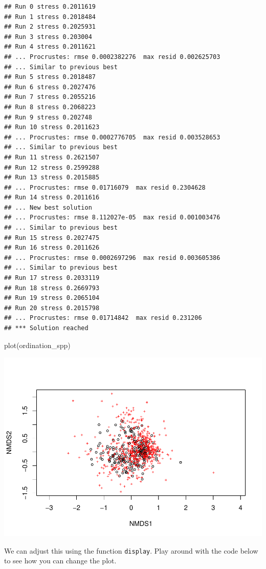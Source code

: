 \documentclass[
]{book}
\newenvironment{Shaded}{\begin{snugshade}}{\end{snugshade}}
\newcommand{\FunctionTok}[1]{\textcolor[rgb]{0.00,0.00,0.00}{#1}}
\newcommand{\NormalTok}[1]{#1}
\begin{document}
\begin{verbatim}
## Run 0 stress 0.2011619 
## Run 1 stress 0.2018484 
## Run 2 stress 0.2025931 
## Run 3 stress 0.203004 
## Run 4 stress 0.2011621 
## ... Procrustes: rmse 0.0002382276  max resid 0.002625703 
## ... Similar to previous best
## Run 5 stress 0.2018487 
## Run 6 stress 0.2027476 
## Run 7 stress 0.2055216 
## Run 8 stress 0.2068223 
## Run 9 stress 0.202748 
## Run 10 stress 0.2011623 
## ... Procrustes: rmse 0.0002776705  max resid 0.003528653 
## ... Similar to previous best
## Run 11 stress 0.2621507 
## Run 12 stress 0.2599288 
## Run 13 stress 0.2015885 
## ... Procrustes: rmse 0.01716079  max resid 0.2304628 
## Run 14 stress 0.2011616 
## ... New best solution
## ... Procrustes: rmse 8.112027e-05  max resid 0.001003476 
## ... Similar to previous best
## Run 15 stress 0.2027475 
## Run 16 stress 0.2011626 
## ... Procrustes: rmse 0.0002697296  max resid 0.003605386 
## ... Similar to previous best
## Run 17 stress 0.2033119 
## Run 18 stress 0.2669793 
## Run 19 stress 0.2065104 
## Run 20 stress 0.2015798 
## ... Procrustes: rmse 0.01714842  max resid 0.231206 
## *** Solution reached
\end{verbatim}

\begin{Shaded}
\begin{Highlighting}[]
\FunctionTok{plot}\NormalTok{(ordination\_spp)}
\end{Highlighting}
\end{Shaded}

\includegraphics{bookdown-demo_files/figure-latex/unnamed-chunk-17-1.pdf}

We can adjust this using the function \texttt{display}. Play around with the code below to see how you can change the plot.
\end{document}
